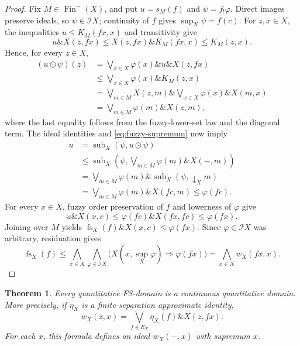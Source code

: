\documentclass[preprint,3p,times]{elsarticle}
\newtheorem{theorem}{Theorem}[section]
\theoremstyle{definition}
\theoremstyle{remark}
\newcommand{\I}{\mathcal{I}}
\newcommand{\supop}{\operatorname{sup}}
\newcommand{\fs}{\operatorname{fs}}
\newcommand{\Finp}{\operatorname{Fin}^{+}}
\newcommand{\subdeg}{\operatorname{sub}}
\newcommand{\tn}{\mathbin{\&}}
\numberwithin{equation}{section}
\begin{document}
\begin{proof}
Fix \(M\in\Finp(X)\), and put \(u=s_M(f)\) and
\(\psi=f_!\varphi\). Direct images preserve ideals, so
\(\psi\in\I X\); continuity of \(f\) gives \(\supop_X\psi=f(c)\).
For \(z,x\in X\), the inequalities \(u\leq K_M(fx,x)\) and
transitivity give
\[
 u\tn X(z,fx)
 \leq X(z,fx)\tn K_M(fx,x)
 \leq K_M(z,x).
\]
Hence, for every \(z\in X\),
\begin{align*}
 (u\odot\psi)(z)
 &=\bigvee_{x\in X}\varphi(x)\tn u\tn X(z,fx)\\
 &\leq\bigvee_{x\in X}\varphi(x)\tn K_M(z,x)\\
 &=\bigvee_{m\in M}X(z,m)\tn
       \bigvee_{x\in X}\varphi(x)\tn X(m,x)\\
 &=\bigvee_{m\in M}\varphi(m)\tn X(z,m), 
\end{align*}
where the last equality follows from the fuzzy-lower-set law and the diagonal term. The ideal identities and \eqref{eq:fuzzy-supremum} now imply
\begin{align*}
 u
 &=\subdeg_X(\psi,u\odot\psi)\\
 &\leq\subdeg_X(\psi,\bigvee_{m\in M}\varphi(m)\tn X(-,m))\\
 &=\bigvee_{m\in M}\varphi(m)\tn\subdeg_X(\psi,\downarrow_X m) \\
 &=\bigvee_{m\in M}\varphi(m)\tn X(fc,m)
 \leq\varphi(fc).
\end{align*}
For every \(x\in X\), fuzzy order preservation of \(f\) and lowerness of \(\varphi\) give
\[
 u\tn X(x,c)\leq\varphi(fc)\tn X(fx,fc)\leq\varphi(fx).
\]
Joining over \(M\) yields \(\fs_X(f)\tn X(x,c)\leq\varphi(fx)\).
Since \(\varphi\in\I X\) was arbitrary, residuation gives
\[
\fs_X(f)
 \leq\bigwedge_{x\in X}\bigwedge_{\varphi\in\I X}
       \bigl(X(x,\supop_X\varphi)\Rightarrow\varphi(fx)\bigr)
 =\bigwedge_{x\in X}w_X(fx,x).
\]
\end{proof}

\begin{theorem}\label{thm:qfs-continuous}
Every quantitative FS-domain is a continuous quantitative domain. More precisely, if \(\eta_X\) is a finite-separation approximate identity,
\begin{equation}\label{eq:way-below-from-approximate-identity}
 w_X(z,x)=\bigvee_{f\in E_X}\eta_X(f)\tn X(z,fx).
\end{equation}
For each \(x\), this formula defines an ideal \(w_X(-,x)\) with supremum \(x\).
\end{theorem}
\end{document}
